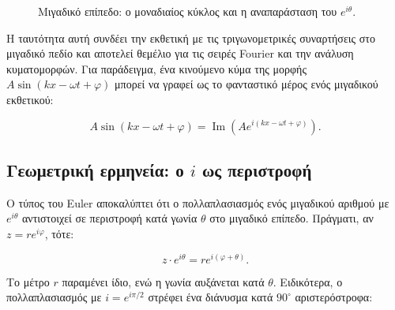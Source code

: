 \documentclass[a4paper, 11pt]{article}
\begin{document}
\begin{figure}[htbp]
\centering
{}
\caption{Μιγαδικό επίπεδο: ο μοναδιαίος κύκλος και η αναπαράσταση του $e^{i\theta}$.}
\label{fig:euler}
\end{figure}

Η ταυτότητα αυτή συνδέει την εκθετική με τις τριγωνομετρικές συναρτήσεις
στο μιγαδικό πεδίο και αποτελεί θεμέλιο για τις σειρές Fourier και την
ανάλυση κυματομορφών. Για παράδειγμα, ένα κινούμενο κύμα της μορφής
\(A\sin(kx - \omega t + \varphi)\) μπορεί να γραφεί ως το φανταστικό
μέρος ενός μιγαδικού εκθετικού:

\[
A\sin(kx - \omega t + \varphi) = \operatorname{Im}\left( A e^{i(kx - \omega t + \varphi)} \right).
\]

\subsection{\texorpdfstring{Γεωμετρική ερμηνεία: ο \(i\) ως
περιστροφή}{Γεωμετρική ερμηνεία: ο i ως περιστροφή}}\label{ux3b3ux3b5ux3c9ux3bcux3b5ux3c4ux3c1ux3b9ux3baux3ae-ux3b5ux3c1ux3bcux3b7ux3bdux3b5ux3afux3b1-ux3bf-i-ux3c9ux3c2-ux3c0ux3b5ux3c1ux3b9ux3c3ux3c4ux3c1ux3bfux3c6ux3ae}

Ο τύπος του Euler αποκαλύπτει ότι ο πολλαπλασιασμός ενός μιγαδικού
αριθμού με \(e^{i\theta}\) αντιστοιχεί σε περιστροφή κατά γωνία
\(\theta\) στο μιγαδικό επίπεδο. Πράγματι, αν \(z = r e^{i\varphi}\),
τότε:

\[
z \cdot e^{i\theta} = r e^{i(\varphi + \theta)}.
\]

Το μέτρο \(r\) παραμένει ίδιο, ενώ η γωνία αυξάνεται κατά \(\theta\).
Ειδικότερα, ο πολλαπλασιασμός με \(i = e^{i\pi/2}\) στρέφει ένα διάνυσμα
κατά \(90^\circ\) αριστερόστροφα:
\end{document}
